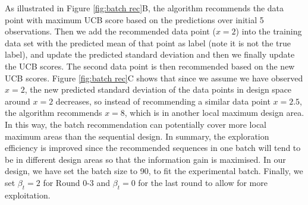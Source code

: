 As illustrated in Figure \ref{fig:batch rec}B, the algorithm recommends the data point with maximum UCB score based on the predictions over initial 5 observations.
Then we add the recommended data point ($x = 2$) into the training data set with the predicted mean of that point as label (note it is not the true label), and update the predicted standard deviation and then we finally update the UCB scores.
The second data point is then recommended based on the new UCB scores.
Figure \ref{fig:batch rec}C shows that since we assume we have observed $x = 2$, the new predicted standard deviation of the data points in design space around $x =2$  decreases, so instead of recommending a similar data point $x = 2.5$, the algorithm recommends $x = 8$, which is in another local maximum design area.
In this way, the batch recommendation can potentially cover more local maximum areas than the sequential design.
In summary, the exploration efficiency is improved since the recommended sequences in one batch will tend to be in different design areas so that the information gain is maximised.
In our design, we have set the batch size to 90, to fit the experimental batch.
Finally, we set $\beta_t = 2$ for Round 0-3 and $\beta_t = 0$ for the last round to allow for more exploitation.
